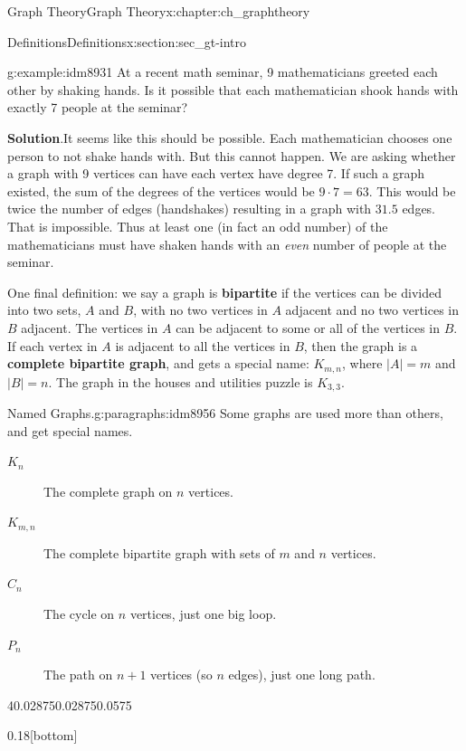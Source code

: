 \documentclass[oneside,10pt,]{book}
\newcommand{\terminology}[1]{\textbf{#1}}
\numberwithin{equation}{chapter}
\begin{document}
\begin{chapterptx}{Graph Theory}{}{Graph Theory}{}{}{x:chapter:ch_graphtheory}
\begin{sectionptx}{Definitions}{}{Definitions}{}{}{x:section:sec_gt-intro}
\begin{example}{}{g:example:idm8931}%
At a recent math seminar, 9 mathematicians greeted each other by shaking hands. Is it possible that each mathematician shook hands with exactly 7 people at the seminar?%
\par\smallskip%
\noindent\textbf{Solution}.\hypertarget{g:solution:idm8934}{}\quad{}It seems like this should be possible. Each mathematician chooses one person to not shake hands with. But this cannot happen. We are asking whether a graph with 9 vertices can have each vertex have degree 7. If such a graph existed, the sum of the degrees of the vertices would be \(9\cdot 7 = 63\). This would be twice the number of edges (handshakes) resulting in a graph with \(31.5\) edges. That is impossible. Thus at least one (in fact an odd number) of the mathematicians must have shaken hands with an \emph{even} number of people at the seminar.%
\end{example}
One final definition: we say a graph is \terminology{bipartite} if the vertices can be divided into two sets, \(A\) and \(B\), with no two vertices in \(A\) adjacent and no two vertices in \(B\) adjacent. The vertices in \(A\) can be adjacent to some or all of the vertices in \(B\). If each vertex in \(A\) is adjacent to all the vertices in \(B\), then the graph is a \terminology{complete bipartite graph}, and gets a special name: \(K_{m,n}\), where \(|A| = m\) and \(|B| = n\). The graph in the houses and utilities puzzle is \(K_{3,3}\).%
\begin{paragraphs}{Named Graphs.}{g:paragraphs:idm8956}%
Some graphs are used more than others, and get special names.%
\begin{description}
\item[{\(K_n\)}]The complete graph on \(n\) vertices.\label{g:notation:idm8965}%
\item[{\(K_{m,n}\)}]The complete bipartite graph with sets of \(m\) and \(n\) vertices. \label{g:notation:idm8975}%
\item[{\(C_n\)}]The cycle on \(n\) vertices, just one big loop. \label{g:notation:idm8985}%
\item[{\(P_n\)}]The path on \(n+1\) vertices (so \(n\) edges), just one long path. \label{g:notation:idm8995}%
\end{description}
%
\begin{sidebyside}{4}{0.02875}{0.02875}{0.0575}%
\begin{sbspanel}{0.18}[bottom]%
\resizebox{\linewidth}{!}{%
				\begin{tikzpicture}[scale=1]

\end{tikzpicture}}
\end{sbspanel}
\end{sidebyside}
\end{paragraphs}
\end{sectionptx}
\end{chapterptx}
\end{document}
